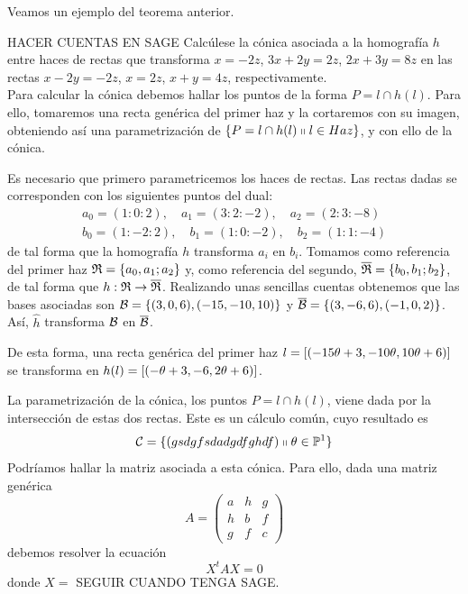 Veamos un ejemplo del teorema anterior.
\begin{exa} HACER CUENTAS EN SAGE
	Calcúlese la cónica asociada a la homografía $h$ entre haces de rectas que transforma $x=-2z$, $3x+2y=2z$, $2x+3y=8z$ en las rectas $x-2y=-2z$, $x=2z$, $x+y=4z$, respectivamente.\\
	
	Para calcular la cónica debemos hallar los puntos de la forma $P=l\cap h(l)$. Para ello, tomaremos una recta genérica del primer haz y la cortaremos con su imagen, obteniendo así una parametrización de $\{P=l\cap h(l)\shortparallel l\in Haz\}$, y con ello de la cónica.
	
	Es necesario que primero parametricemos los haces de rectas. Las rectas dadas se corresponden con los siguientes puntos del dual:
	\begin{equation*}
		\begin{split}
			a_0=(1:0:2), \quad a_1=(3:2:-2), \quad a_2=(2:3:-8)\\
			b_0=(1:-2:2), \quad b_1=(1:0:-2), \quad b_2=(1:1:-4)
		\end{split}
	\end{equation*}
	de tal forma que la homografía $h$ transforma $a_i$ en $b_i$. Tomamos como referencia del primer haz $\mathfrak{R}=\{a_0,a_1;a_2\}$ y, como referencia del segundo, $\overline{\mathfrak{R}}=\{b_0,b_1;b_2\}$, de tal forma que $h:\mathfrak{R}\rightarrow  \overline{\mathfrak{R}}$. Realizando unas sencillas cuentas obtenemos que las bases asociadas son $\mathcal{B}=\{(3,0,6),(-15,-10,10)\}$ y $\overline{\mathcal{B}}=\{(3,-6,6),(-1,0,2)\}$. Así, $\widehat{h}$ transforma $\mathcal{B}$ en $\overline{\mathcal{B}}$.
	
	De esta forma, una recta genérica del primer haz $l=\left [ (-15\theta+3,-10\theta,10\theta+6) \right ]$ se transforma en $h(l)=\left [ (-\theta+3,-6,2\theta+6) \right ]$.
	
	La parametrización de la cónica, los puntos $P=l\cap h(l)$, viene dada por la intersección de estas dos rectas. Este es un cálculo común, cuyo resultado es
	\begin{equation*}
		\mathcal{C}=\{(gsdgfsdadgdfghdf)\shortparallel \theta\in\mathbb{P}^1\}
	\end{equation*}
	Podríamos hallar la matriz asociada a esta cónica. Para ello, dada una matriz genérica
	\begin{equation*}
		A=\left( \begin{array}{ccc}
			a & h & g\\
			h & b & f\\
			g & f & c
		\end{array}\right) 
	\end{equation*}
	debemos resolver la ecuación
	\begin{equation*}
		X^tAX=0
	\end{equation*}
	donde $X=$ SEGUIR CUANDO TENGA SAGE.
\end{exa}

